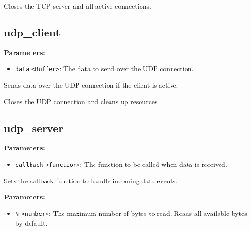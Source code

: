 \documentclass[12pt,a4paper]{article}
\begin{document}
\noindent Closes the TCP server and all active connections.


\subsection{udp\_client}
\vspace{5mm}
\noindent {}


\noindent \textbf{Parameters:}
\begin{itemize}
  \item \texttt{data} \texttt{<Buffer>}: The data to send over the UDP connection.
\end{itemize}

\noindent Sends data over the UDP connection if the client is active.

\vspace{5mm}
\noindent {}


\noindent Closes the UDP connection and cleans up resources.


\subsection{udp\_server}
\vspace{5mm}
\noindent {}


\noindent \textbf{Parameters:}
\begin{itemize}
  \item \texttt{callback} \texttt{<function>}: The function to be called when data is received.
\end{itemize}

\noindent Sets the callback function to handle incoming data events.

\vspace{5mm}
\noindent {}


\noindent \textbf{Parameters:}
\begin{itemize}
  \item \texttt{N} \texttt{<number>}: The maximum number of bytes to read. Reads all available bytes by default.
\end{itemize}
\end{document}
